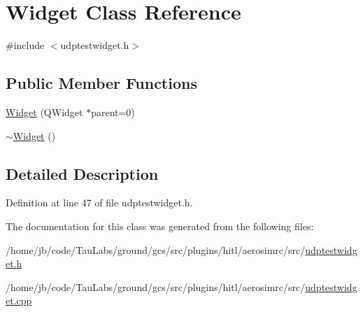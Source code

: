 \hypertarget{class_widget}{\section{\-Widget \-Class \-Reference}
\label{class_widget}
}


{\ttfamily \#include $<$udptestwidget.\-h$>$}

\subsection*{\-Public \-Member \-Functions}
\begin{DoxyCompactItemize}
\item 
\hyperlink{group___aero_sim_r_c_ga29531c7f141e461322981b3b579d4590}{\-Widget} (\-Q\-Widget $\ast$parent=0)
\item 
\hyperlink{group___aero_sim_r_c_gaa24f66bcbaaec6d458b0980e8c8eae65}{$\sim$\-Widget} ()
\end{DoxyCompactItemize}


\subsection{\-Detailed \-Description}


\-Definition at line 47 of file udptestwidget.\-h.



\-The documentation for this class was generated from the following files\-:\begin{DoxyCompactItemize}
\item 
/home/jb/code/\-Tau\-Labs/ground/gcs/src/plugins/hitl/aerosimrc/src/\hyperlink{udptestwidget_8h}{udptestwidget.\-h}\item 
/home/jb/code/\-Tau\-Labs/ground/gcs/src/plugins/hitl/aerosimrc/src/\hyperlink{udptestwidget_8cpp}{udptestwidget.\-cpp}\end{DoxyCompactItemize}
